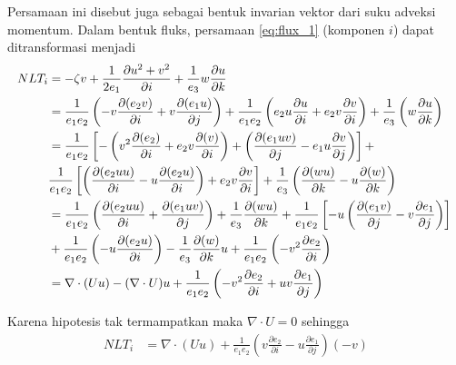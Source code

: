 \begin{spacing}{1.5}
	Persamaan ini disebut juga sebagai bentuk invarian vektor dari suku adveksi momentum. Dalam bentuk fluks, persamaan \ref{eq:flux_1} (komponen $i$) dapat ditransformasi menjadi
	\begin{equation*}
    		\resizebox{\textwidth}{!}{%
			$
		\begin{aligned}
			NLT_i &= -\zeta v + \frac{1}{2e_1} \frac{\partial u^2+v^2}{\partial i} + \frac{1}{e_3}w\frac{\partial u}{\partial k} \\
			&= \frac{1}{e_1 e_2}\left(-v\frac{\partial (e_2 v)}{\partial i} + v\frac{\partial (e_1 u)}{\partial j}\right) + \frac{1}{e_1 e_2}\left(e_2 u\frac{\partial u}{\partial i} + e_2 v\frac{\partial v}{\partial i}\right) + \frac{1}{e_3}\left( w\frac{\partial u}{\partial k}\right)  
			\\
			&= \frac{1}{e_1 e_2} \left[-\left(v^2\frac{\partial (e_2)}{\partial i} + e_2v\frac{\partial (v)}{\partial i}\right) + \left(\frac{\partial (e_1uv)}{\partial j} - e_1u\frac{\partial v}{\partial j}\right)\right] +  
			\\
			& \frac{1}{e_1 e_2} \left[\left(\frac{\partial (e_2uu)}{\partial i} - u\frac{\partial (e_2u)}{\partial i}\right) + e_2v\frac{\partial v}{\partial i} \right] + \frac{1}{e_3}\left(\frac{\partial (wu)}{\partial k} - u\frac{\partial (w)}{\partial k}\right) 
			\\
			&= \frac{1}{e_1e_2}\left(\frac{\partial (e_2uu)}{\partial i} + \frac{\partial (e_1uv)}{\partial j}\right)+
			\frac{1}{e_3}\frac{\partial (wu)}{\partial k}+\frac{1}{e_1e_2}\left[-u\left(\frac{\partial (e_1v)}{\partial j}-v\frac{\partial e_1}{\partial j}\right)\right] 
			\\ 
			& + \frac{1}{e_1e_2}\left(-u\frac{\partial (e_2u)}{\partial i}\right) - \frac{1}{e_3}\frac{\partial (w)}{\partial k}u + \frac{1}{e_1e_2}\left(-v^2\frac{\partial e_2}{\partial i}\right)  	
			\\
			&= \nabla \cdot (Uu)-(\nabla \cdot U)u + \frac{1}{e_1e_2}\left(-v^2\frac{\partial e_2}{\partial i}+uv\frac{\partial e_1}{\partial j}\right)%
		\end{aligned}
				$
		}
	\end{equation*}
	
	Karena hipotesis tak termampatkan maka $\nabla \cdot U = 0$ sehingga
	\begin{equation}
		\begin{aligned}
			NLT_i &= \nabla \cdot (Uu) +  \frac{1}{e_1e_2}\left(v\frac{\partial e_2}{\partial i}-u\frac{\partial e_1}{\partial j}\right)(-v)
		\end{aligned}
	\end{equation}
	

\end{spacing}

